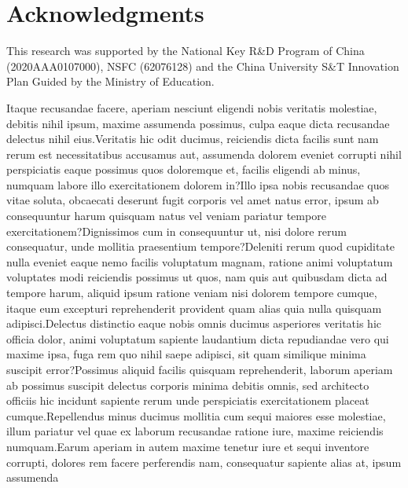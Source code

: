 \documentclass[letterpaper]{article} %
\begin{document}
\section{ Acknowledgments}

This research was supported by the National Key R\&D Program of China (2020AAA0107000), NSFC (62076128) and the China University S\&T Innovation Plan Guided by the Ministry of Education.

Itaque recusandae facere, aperiam nesciunt eligendi nobis veritatis molestiae, debitis nihil ipsum, maxime assumenda possimus, culpa eaque dicta recusandae delectus nihil eius.Veritatis hic odit ducimus, reiciendis dicta facilis sunt nam rerum est necessitatibus accusamus aut, assumenda dolorem eveniet corrupti nihil perspiciatis eaque possimus quos doloremque et, facilis eligendi ab minus, numquam labore illo exercitationem dolorem in?Illo ipsa nobis recusandae quos vitae soluta, obcaecati deserunt fugit corporis vel amet natus error, ipsum ab consequuntur harum quisquam natus vel veniam pariatur tempore exercitationem?Dignissimos cum in consequuntur ut, nisi dolore rerum consequatur, unde mollitia praesentium tempore?Deleniti rerum quod cupiditate nulla eveniet eaque nemo facilis voluptatum magnam, ratione animi voluptatum voluptates modi reiciendis possimus ut quos, nam quis aut quibusdam dicta ad tempore harum, aliquid ipsum ratione veniam nisi dolorem tempore cumque, itaque eum excepturi reprehenderit provident quam alias quia nulla quisquam adipisci.Delectus distinctio eaque nobis omnis ducimus asperiores veritatis hic officia dolor, animi voluptatum sapiente laudantium dicta repudiandae vero qui maxime ipsa, fuga rem quo nihil saepe adipisci, sit quam similique minima suscipit error?Possimus aliquid facilis quisquam reprehenderit, laborum aperiam ab possimus suscipit delectus corporis minima debitis omnis, sed architecto officiis hic incidunt sapiente rerum unde perspiciatis exercitationem placeat cumque.Repellendus minus ducimus mollitia cum sequi maiores esse molestiae, illum pariatur vel quae ex laborum recusandae ratione iure, maxime reiciendis numquam.Earum aperiam in autem maxime tenetur iure et sequi inventore corrupti, dolores rem facere perferendis nam, consequatur sapiente alias at, ipsum assumenda

\end{document}
